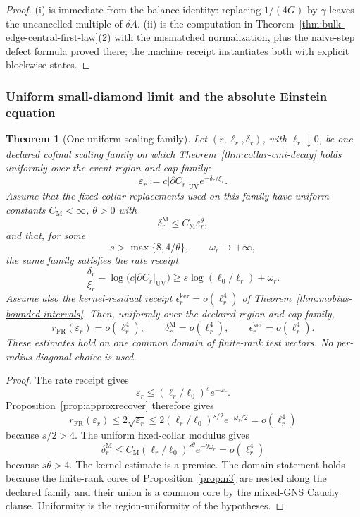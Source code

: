 \documentclass[11pt]{article}
\newtheorem{theorem}{Theorem}[section]
\begin{document}
\begin{proof}
(i) is immediate from the balance identity: replacing \(1/(4G)\) by
\(\gamma\) leaves the uncancelled multiple of \(\delta A\). (ii) is the
computation in Theorem~\ref{thm:bulk-edge-central-first-law}(2) with the
mismatched normalization, plus the naive-step defect formula proved there;
the machine receipt instantiates both with explicit blockwise states.
\end{proof}

\subsubsection{Uniform small-diamond limit and the absolute Einstein equation}
\label{subsubsec:uniform-small-diamond-absolute}

\begin{theorem}[One uniform scaling family]
\label{thm:uniform-scaling-family}
Let \((r,\ell_r,\delta_r)\), with \(\ell_r\downarrow0\), be one declared
cofinal scaling family on which Theorem~\ref{thm:collar-cmi-decay} holds
uniformly over the event region and cap family:
\[
\varepsilon_r
:=
c|\partial C_r|_{\mathrm{UV}}e^{-\delta_r/\xi_r}.
\]
Assume that the fixed-collar replacements used on this family have uniform
constants \(C_{\mathrm M}<\infty\), \(\theta>0\) with
\[
\delta_r^{\mathrm M}\le C_{\mathrm M}\varepsilon_r^\theta,
\]
and that, for some
\[
s>\max\{8,4/\theta\},\qquad \omega_r\longrightarrow+\infty,
\]
the same family satisfies the rate receipt
\[
\frac{\delta_r}{\xi_r}
-\log\!\bigl(c|\partial C_r|_{\mathrm{UV}}\bigr)
\ge
s\log(\ell_0/\ell_r)+\omega_r.
\]
Assume also the kernel-residual receipt
\(\epsilon_r^{\mathrm{ker}}=o(\ell_r^4)\) of
Theorem~\ref{thm:mobius-bounded-intervals}. Then, uniformly over the declared
region and cap family,
\[
r_{\mathrm{FR}}(\varepsilon_r)=o(\ell_r^4),
\qquad
\delta_r^{\mathrm M}=o(\ell_r^4),
\qquad
\epsilon_r^{\mathrm{ker}}=o(\ell_r^4).
\]
These estimates hold on one common domain of finite-rank test vectors.
No per-radius diagonal choice is used.
\end{theorem}

\begin{proof}
The rate receipt gives
\[
\varepsilon_r
\le
(\ell_r/\ell_0)^s e^{-\omega_r}.
\]
Proposition~\ref{prop:approxrecover} therefore gives
\[
r_{\mathrm{FR}}(\varepsilon_r)
\le2\sqrt{\varepsilon_r}
\le2(\ell_r/\ell_0)^{s/2}e^{-\omega_r/2}
=o(\ell_r^4)
\]
because \(s/2>4\). The uniform fixed-collar modulus gives
\[
\delta_r^{\mathrm M}
\le C_{\mathrm M}(\ell_r/\ell_0)^{s\theta}
e^{-\theta\omega_r}
=o(\ell_r^4)
\]
because \(s\theta>4\). The kernel estimate is a premise. The domain statement
holds because the finite-rank cores of
Proposition~\ref{prop:n3} are nested along the declared family and their
union is a common core by the mixed-GNS Cauchy clause. Uniformity is the
region-uniformity of the hypotheses.
\end{proof}
\end{document}
